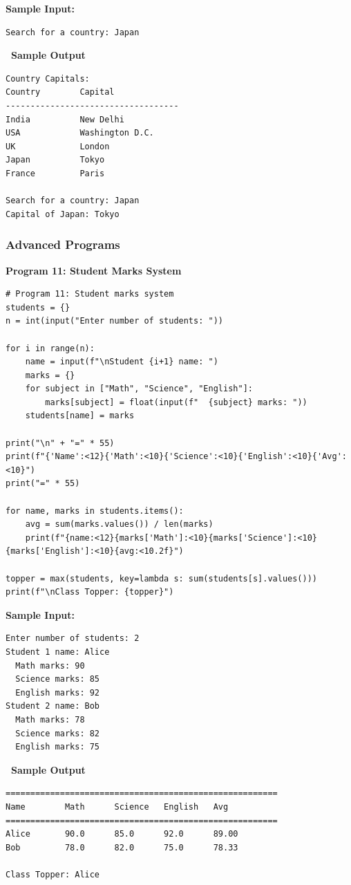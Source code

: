 \documentclass[12pt,a4paper]{article}
\newcommand{\outhead}{\noindent\colorbox{cmrgreen!25}%
  {\textbf{\small\color{cmrdark}~Sample Output~}}\par\vspace{-1pt}}
\begin{document}
\textbf{Sample Input:}
\begin{verbatim}
Search for a country: Japan
\end{verbatim}

\outhead
\begin{lstlisting}[style=outputstyle]
Country Capitals:
Country        Capital
-----------------------------------
India          New Delhi
USA            Washington D.C.
UK             London
Japan          Tokyo
France         Paris

Search for a country: Japan
Capital of Japan: Tokyo
\end{lstlisting}

\subsubsection{Advanced Programs}

\textbf{Program 11: Student Marks System}

\begin{lstlisting}
# Program 11: Student marks system
students = {}
n = int(input("Enter number of students: "))

for i in range(n):
    name = input(f"\nStudent {i+1} name: ")
    marks = {}
    for subject in ["Math", "Science", "English"]:
        marks[subject] = float(input(f"  {subject} marks: "))
    students[name] = marks

print("\n" + "=" * 55)
print(f"{'Name':<12}{'Math':<10}{'Science':<10}{'English':<10}{'Avg':<10}")
print("=" * 55)

for name, marks in students.items():
    avg = sum(marks.values()) / len(marks)
    print(f"{name:<12}{marks['Math']:<10}{marks['Science']:<10}{marks['English']:<10}{avg:<10.2f}")

topper = max(students, key=lambda s: sum(students[s].values()))
print(f"\nClass Topper: {topper}")
\end{lstlisting}

\textbf{Sample Input:}
\begin{verbatim}
Enter number of students: 2
Student 1 name: Alice
  Math marks: 90
  Science marks: 85
  English marks: 92
Student 2 name: Bob
  Math marks: 78
  Science marks: 82
  English marks: 75
\end{verbatim}

\outhead
\begin{lstlisting}[style=outputstyle]
=======================================================
Name        Math      Science   English   Avg
=======================================================
Alice       90.0      85.0      92.0      89.00
Bob         78.0      82.0      75.0      78.33

Class Topper: Alice
\end{lstlisting}
\end{document}
